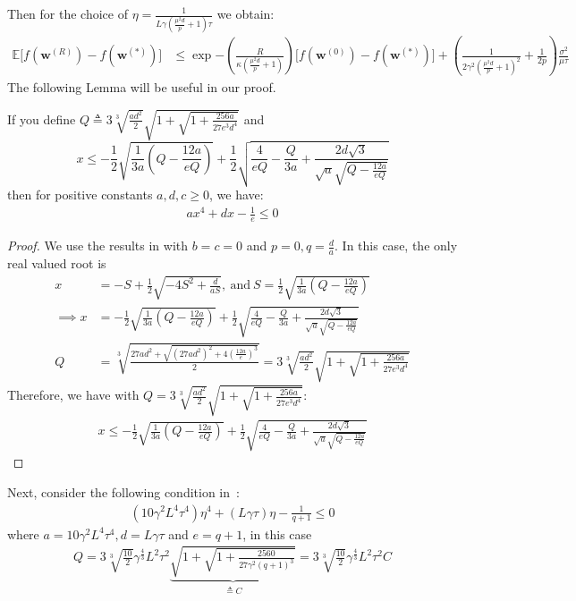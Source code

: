 Then for the choice of $\eta=\frac{1}{L\gamma (\frac{\mu^2d}{p}+1) \tau}$ we obtain:
\begin{align}
                \mathbb{E}\Big[f({\boldsymbol{w}}^{(R)})-f({\boldsymbol{w}}^{(*)})\Big]&\leq \exp{-\left(\frac{ R}{\kappa (\frac{\mu^2d}{p}+1)}\right)}\Big[f({\boldsymbol{w}}^{(0)})-f({\boldsymbol{w}}^{(*)})\Big]+\left(\frac{1}{2\gamma^2 {(\frac{\mu^2d}{p}+1)}^2 }+\frac{1}{2p}\right)\frac{\sigma^2}{\mu\tau}
\end{align}
The following Lemma will be useful in our proof. 
\begin{lemma}
If you define $Q\triangleq3\sqrt[3]{\frac{ad^2}{2}}\sqrt{1+\sqrt{1+\frac{256 a}{27e^3d^4}}}$ and $$x\leq -\frac{1}{2}\sqrt{\frac{1}{3a}\left(Q-\frac{12a}{eQ}\right)}+\frac{1}{2}\sqrt{\frac{4}{eQ}-\frac{Q}{3a}+\frac{2d\sqrt{3}}{\sqrt{a}\sqrt{Q-\frac{12a}{e Q}}}}$$ then for positive constants $a,d,c\geq 0$, we have:
\begin{align}
    ax^{4}+dx-\frac{1}{e}\leq 0
\end{align}
\end{lemma}
\begin{proof}
We use the results in \cite{wiki:xxx} with $b=c=0$ and $p=0, q=\frac{d}{a}$. In this case, the only real valued root is 
\begin{align}
x&=-S+\frac{1}{2}\sqrt{-4S^2+\frac{d}{aS}},\:\text{and}\:S=\frac{1}{2}\sqrt{\frac{1}{3a}\left(Q-\frac{12a}{eQ}\right)}\nonumber\\
\implies x&=-\frac{1}{2}\sqrt{\frac{1}{3a}\left(Q-\frac{12a}{eQ}\right)}+\frac{1}{2}\sqrt{\frac{4}{eQ}-\frac{Q}{3a}+\frac{2d\sqrt{3}}{\sqrt{a}\sqrt{Q-\frac{12a}{e Q}}}} \nonumber\\
Q&=\sqrt[3]{\frac{{27a}{d^2}+\sqrt{\left({27a}{d^2}\right)^2+4\left(\frac{12a}{e}\right)^3}}{2}}=3\sqrt[3]{\frac{ad^2}{2}}\sqrt{1+\sqrt{1+\frac{256 a}{27e^3d^4}}}
\end{align} 
Therefore, we have with $Q=3\sqrt[3]{\frac{ad^2}{2}}\sqrt{1+\sqrt{1+\frac{256 a}{27e^3d^4}}}$:
\begin{align}
    x\leq -\frac{1}{2}\sqrt{\frac{1}{3a}\left(Q-\frac{12a}{eQ}\right)}+\frac{1}{2}\sqrt{\frac{4}{eQ}-\frac{Q}{3a}+\frac{2d\sqrt{3}}{\sqrt{a}\sqrt{Q-\frac{12a}{e Q}}}}
\end{align}
\end{proof}

Next, consider the following condition in~\cite{haddadpour2020federated}: 
\begin{align}
    \left(10\gamma^2L^4\tau^4\right)\eta^4+\left(L\gamma\tau\right)\eta-\frac{1}{q+1}\leq 0
\end{align}
where $a=10\gamma^2L^4\tau^4, d=L\gamma\tau$ and $e=q+1$, in this case 
\begin{align}
    Q=3\sqrt[3]{\frac{10}{2}}\gamma^{\frac{4}{3}} L^2\tau^2\underbrace{\sqrt{1+\sqrt{1+\frac{2560}{27\gamma^2(q+1)^3}}}}_{\triangleq C}=3\sqrt[3]{\frac{10}{2}}\gamma^{\frac{4}{3}} L^2\tau^2 C
\end{align}

